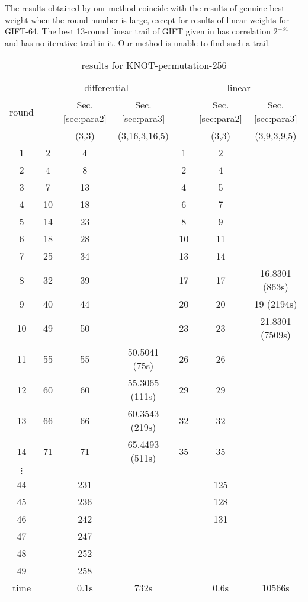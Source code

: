 The results obtained by our method coincide with the results of genuine best weight when the round number is large, except for results of linear weights for GIFT-64. The best 13-round linear trail of GIFT given in \cite{ZZDX19} has correlation $2^{-34}$ and has no iterative trail in it. Our method is unable to find such a trail. 

\begin{table}
	\caption{results for KNOT-permutation-256}\label{tab:knot256}
	\centering
	\begin{tabular}{|c|c|c|c|c|c|c|}
		\hline
		\multirow{3}{*}{round}&\multicolumn{3}{|c|}{differential}&\multicolumn{3}{|c|}{linear}\\
        \cline{2-7}
		&\multirow{2}{*}{\cite{ZDY19}}&Sec. \ref{sec:para2}&Sec. \ref{sec:para3}&\multirow{2}{*}{\cite{ZDY19}}&Sec. \ref{sec:para2}&Sec. \ref{sec:para3}\\
		\cline{3-4}\cline{6-7}
		&&(3,3)&(3,16,3,16,5)&&(3,3)&(3,9,3,9,5)\\
        \hline
		1&	2&	4&	& 			1&	2&	\\
		2&	4&	8&	& 			2&	4&	\\
		3&	7&	13&	& 			4&	5&	\\
		4&	10&	18&	& 			6&	7&	\\
		5&	14&	23&	& 			8&	9&	\\
		6&	18&	28&	& 			10&	11&	\\
		7&	25&	34&	&			13&	14&	\\
		8&	32&	39&	&			17&	17&	16.8301 (863s)\\
		9&	40&	44&	&			20&	20&	19 (2194s)\\
		10&	49&	50&	&			23&	23&	21.8301 (7509s)\\
		11&	55&	55&	50.5041 (75s)&	26&	26&	\\
		12&	60&	60&	55.3065 (111s)&	29&	29&	\\
		13&	66&	66&	60.3543 (219s)&	32&	32&	\\
		14&	71&	71&	65.4493 (511s)&	35&	35&	\\
		$\vdots$&&&&&&\\
		44&	&	231&	&	&	125&	\\
		45&	&	236&	&	&	128&	\\
		46&	&	242&	&	&	131&	\\
		47&	&	247&	&	&	&	\\
		48&	&	252&	&	&	&	\\
		49&	&	258&	&	&	&	\\
		\hline
		time& &0.1s&732s& &0.6s&10566s\\
		\hline
	\end{tabular}
\end{table}

